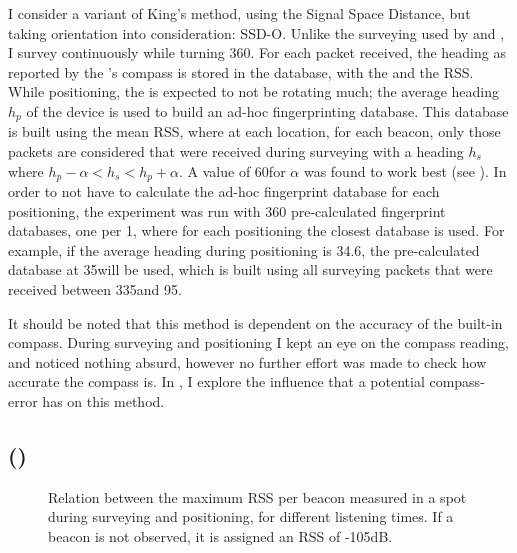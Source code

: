 I consider a variant of King's method, using the Signal Space Distance, but taking orientation into consideration: SSD-O.
Unlike the \wifi surveying used by \citet{bahl2000radar} and \citet{king2006compass}, I survey continuously while turning 360\tdegree.
For each packet received, the heading as reported by the \device's compass is stored in the database, with the \bid and the RSS.
While positioning, the \device is expected to not be rotating much; the average heading $h_p$ of the device is used to build an ad-hoc fingerprinting database.
This database is built using the mean RSS, where at each location, for each beacon, only those packets are considered that were received during surveying with a heading $h_s$ where $h_p - \alpha < h_s < h_p + \alpha$.
A value of 60\tdegree for $\alpha$ was found to work best (see ).
In order to not have to calculate the ad-hoc fingerprint database for each positioning, the experiment was run with 360 pre-calculated fingerprint databases, one per 1\tdegree, where for each positioning the closest database is used.
For example, if the average heading during positioning is 34.6\tdegree, the pre-calculated database at 35\tdegree will be used, which is built using all surveying packets that were received between 335\tdegree and 95\tdegree.

It should be noted that this method is dependent on the accuracy of the built-in compass.
During surveying and positioning I kept an eye on the compass reading, and noticed nothing absurd, however no further effort was made to check how accurate the compass is.
In , I explore the influence that a potential compass-error has on this method.

\subsection{\BRP (\aBRP)}
\label{sec:architecture-brp}
\begin{figure}[p]
    \begin{subfigure}[b]{0.5\textwidth}
    \end{subfigure}
    \begin{subfigure}[b]{0.5\textwidth}
    \end{subfigure}
    \begin{subfigure}[b]{0.5\textwidth}
    \end{subfigure}
    \begin{subfigure}[b]{0.5\textwidth}
    \end{subfigure}
    \caption{Relation between the maximum RSS per beacon measured in a spot during surveying and positioning, for different listening times. If a beacon is not observed, it is assigned an RSS of -105dB.}
    \label{fig:architecture-rss-cloud}
\end{figure}

